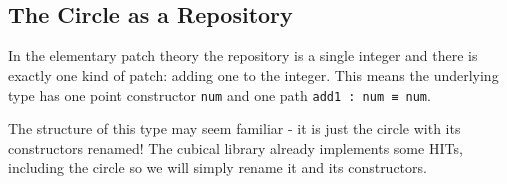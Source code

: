 \begin{code}[hide]
%
\>[2]\AgdaSymbol{;}\AgdaSpace{}%
\<%
\\
%
\>[2]\AgdaSymbol{;}\AgdaSpace{}%
\<%
\\
%
\>[2]\AgdaSymbol{;}\AgdaSpace{}%
\<%
\\
%
\>[2]\AgdaSymbol{;}\AgdaSpace{}%
\<%
\\
%
\>[2]\AgdaSymbol{)}\<%
\\
%
\\[\AgdaEmptyExtraSkip]%
\>[0]\AgdaSpace{}%
\AgdaSpace{}%
\<%
\\
\>[0][@{}l@{\AgdaIndent{0}}]%
\>[2]\AgdaSpace{}%
\AgdaSymbol{(}\AgdaSymbol{)}\<%
\end{code}

\subsection{The Circle as a Repository}

In the elementary patch theory the repository is a single integer and there is exactly
one kind of patch: adding one to the integer.
This means the underlying type has one point constructor \texttt{num} and
one path \texttt{add1 : num ≡ num}.

The structure of this type may seem familiar - it is just the circle with its constructors renamed!
The cubical library already implements some HITs, including the circle so we will simply rename it and
its constructors.

